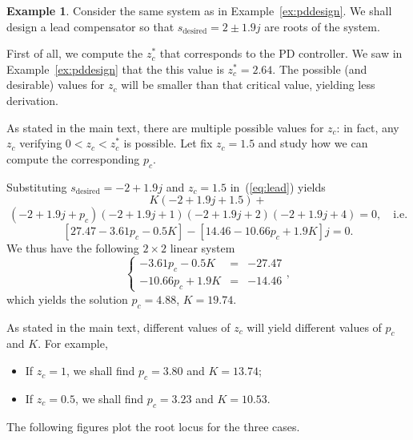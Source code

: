 \documentclass[a4paper,11pt]{report}
\theoremstyle{definition}
\newcommand{\des}{\textrm{desired}}
\newtheorem{mdexample}{Example}
\newenvironment{example}%
  {\vspace{0.1cm}\begin{mdframed}[backgroundcolor=lightgray]\begin{mdexample}}%
  {\end{mdexample}\end{mdframed}\vspace{0.1cm}}
\begin{document}
\begin{example}
  \label{ex:lead}
  Consider the same system as in Example~\ref{ex:pddesign}. We shall
  design a lead compensator so that $s_\des = 2\pm 1.9j$ are roots of
  the system.

  First of all, we compute the $z^*_c$ that corresponds to the PD
  controller. We saw in Example~\ref{ex:pddesign} that the this value
  is $z^*_c=2.64$. The possible (and desirable) values for $z_c$ will
  be smaller than that critical value, yielding less derivation.

  As stated in the main text, there are multiple possible values for
  $z_c$: in fact, any $z_c$ verifying $0<z_c<z^*_c$ is possible. Let
  fix $z_c=1.5$ and study how we can compute the
  corresponding $p_c$.

  Substituting $s_\des=-2+1.9j$ and $z_c=1.5$ in~(\ref{eq:lead})
  yields
  \[
  K(-2+1.9j+1.5) +
  \]
  \[
  (-2+1.9j+p_c)(-2+1.9j+1)(-2+1.9j+2)(-2+1.9j+4) =0, \quad \textrm{i.e.}
  \]
  \begin{equation}
    \label{eq:leadeq}
    [27.47-3.61p_c-0.5K] - [14.46-10.66p_c+1.9K]j=0.  
  \end{equation}
  We thus have the following $2\times 2$ linear system
  \[
  \left\{
    \begin{array}{ccc}
      -3.61p_c-0.5K&=&-27.47\\
      -10.66p_c+1.9K&=&-14.46
    \end{array}
  \right.,
  \]
  which yields the solution $p_c=4.88$, $K=19.74$.

  As stated in the main text, different values of $z_c$ will yield
  different values of $p_c$ and $K$. For example,
  \begin{itemize}
  \item If $z_c=1$, we shall find $p_c=3.80$ and $K=13.74$;
  \item If $z_c=0.5$, we shall find $p_c=3.23$ and $K=10.53$.
  \end{itemize}

  The following figures plot the root locus for the three cases.


\end{example}
\end{document}

